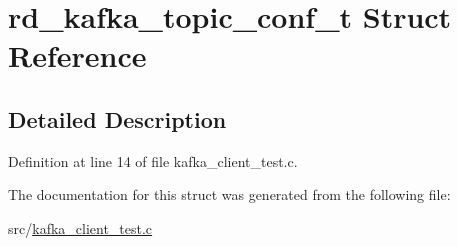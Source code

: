 \hypertarget{structrd__kafka__topic__conf__t}{\section{rd\-\_\-kafka\-\_\-topic\-\_\-conf\-\_\-t \-Struct \-Reference}
\label{structrd__kafka__topic__conf__t}
}


\subsection{\-Detailed \-Description}


\-Definition at line 14 of file kafka\-\_\-client\-\_\-test.\-c.



\-The documentation for this struct was generated from the following file\-:\begin{DoxyCompactItemize}
\item 
src/\hyperlink{kafka__client__test_8c}{kafka\-\_\-client\-\_\-test.\-c}\end{DoxyCompactItemize}
